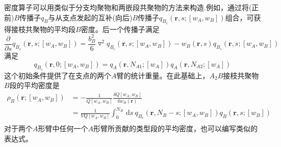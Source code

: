 密度算子可以用类似于分支均聚物和两嵌段共聚物的方法来构造.例如，通过将(正前)$B$传播子$q_B$与从支点发起的互补(向后)$B$传播子$q_{B_c}(\mathbf{r},s;[w_A,w_B])$组合，可获得接枝共聚物的平均段$B$密度。后一个传播子满足
\begin{equation}
\frac{\partial}{\partial s}q_{B_c}(\mathbf{r},s;[w_A,w_B])=\frac{b_B^2}{6}\triangledown ^2q_{B_c}(\mathbf{r},s;[w_A,w_B])-w_B(\mathbf{r},s)q_{B_c}(\mathbf{r},s;[w_A,w_B])
\end{equation}
满足
\begin{equation}
q_{B_c}(\mathbf{r},0;[w_A,w_B])=q_A(\mathbf{r},N_{A1};[w_A])q_A(\mathbf{r},N_{A2};[w_A])
\end{equation}
这个初始条件提供了在支点的两个$A$臂的统计重量。在此基础上，$A_2B$接枝共聚物$B$段的平均密度是
\begin{equation}
\begin{aligned}
\rho _B(\mathbf{r};[w_A,w_B]) & =-\frac{1}{Q[w_A,w_B]}	\frac{\delta Q[w_A,w_B]}{\delta w_B(\mathbf{r})} \\
&= \frac{1}{VQ[w_A,w_B]} \int _{0}^{N_B}\,\mathrm{d}s~q_{B_c}(\mathbf{r},N_B-s;[w_A,w_B])q_B(\mathbf{r},s;[w_B]) \\
\end{aligned}	
\end{equation}
对于两个$A$形臂中任何一个$A$形臂所贡献的类型段的平均密度，也可以编写类似的表达式。
